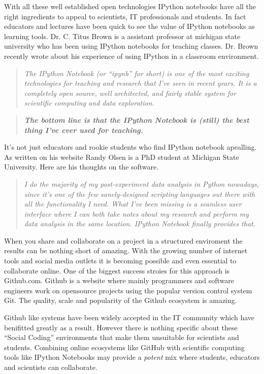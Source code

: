 \documentclass[11pt, a4paper]{article}  %
\begin{document}
\begin{multicols}{2}
With all these well established open technologies IPython notebooks have all
the right ingredients to appeal to scientists, IT professionals and students.
In fact educators and lectures have been quick to see the value of IPython
notebooks as learning tools. Dr. C. Titus Brown is a assistant professor at
michigan state university who has been using IPython notebooks for teaching
classes. Dr. Brown recently wrote about his experience of using IPython in a
classroom environment. \cite{brown}

\begin{quote} 
\textit{The IPython Notebook (or ``ipynb'' for short) is one of the most
exciting technologies for teaching and research that I've seen in recent
years. It is a completely open source, well architected, and fairly stable
system for scientific computing and data exploration.}
\end{quote}

\begin{quote}
\textit{\textbf{The bottom line is that the IPython Notebook is (still) the
best thing I've ever used for teaching.}}
\end{quote}

It's not just educators and rookie students who find IPython notebook
apealling. As written on his website Randy Olsen is a PhD student at Michigan
State University. Here are his thoughts on the software. \cite{olson}

\begin{quote}
\textit{I do the majority of my post-experiment data analysis in Python
nowadays, since it’s one of the few sanely-designed scripting languages out
there with all the functionality I need. What I’ve been missing is a seamless
user interface where I can both take notes about my research and perform my
data analysis in the same location. IPython Notebook finally provides that.}
\end{quote}

When you share and collaborate on a project in a structured enviroment the
results can be nothing short of amazing. With the growing number of internet
tools and social media outlets it is becoming possible and even essential to
collaborate online. One of the biggest success stroies for this approach is
Github.com. Github is a website where mainly programmers and software engineers
work on opensource projects using the popular version control system Git. The
quality, scale and popularity of the Github ecosystem is amazing.

Github like systems have been widely accepted in the IT community which have
benifitted greatly as a result. However there is nothing specific about these
``Social Coding'' environments that make them unsuitable for scientists and
students. Combining online ecosystems like GitHub with scientific computing
tools like IPython Notebooks may provide a \emph{potent} mix where students,
educators and scientists can collaborate. 


\end{multicols}
\end{document}
